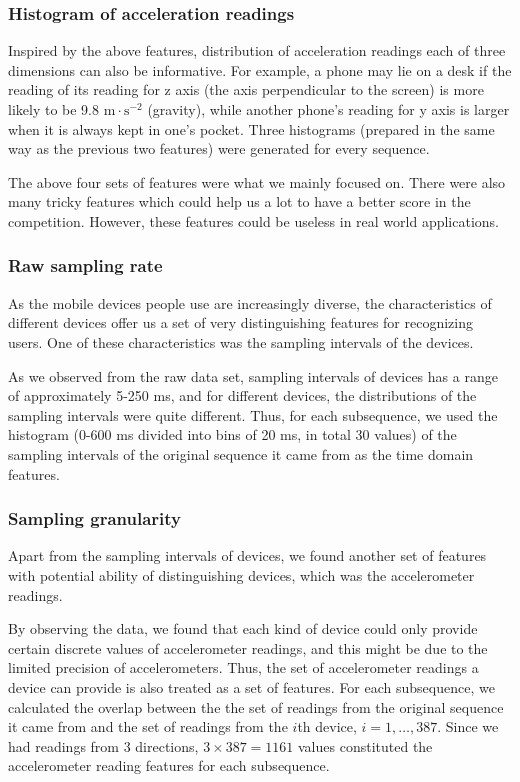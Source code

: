 \documentclass{article} %
\begin{document}
\subsubsection{Histogram of acceleration readings}
Inspired by the above features, distribution of acceleration readings each of three dimensions can also be informative. For example, a phone may lie on a desk if the reading of its reading for z axis (the axis perpendicular to the screen) is more likely to be 9.8 $\mathrm{m}\cdot \mathrm{s}^{-2}$ (gravity), while another phone's reading for y axis is larger when it is always kept in one's pocket. Three histograms (prepared in the same way as the previous two features) were generated for every sequence.

The above four sets of features were what we mainly focused on. There were also many tricky features which could help us a lot to have a better score in the competition. However, these features could be useless in real world applications. 

\subsubsection{Raw sampling rate}
As the mobile devices people use are increasingly diverse, the characteristics of different devices offer us a set of very distinguishing features for recognizing users. One of these characteristics was the sampling intervals of the devices.

As we observed from the raw data set, sampling intervals of devices has a range of approximately 5-250 ms, and for different devices, the distributions of the sampling intervals were quite different. Thus, for each subsequence, we used the histogram (0-600 ms divided into bins of 20 ms, in total 30 values) of the sampling intervals of the original sequence it came from as the time domain features. 

\subsubsection{Sampling granularity}
Apart from the sampling intervals of devices, we found another set of features with potential ability of distinguishing devices, which was the accelerometer readings.

By observing the data, we found that each kind of device could only provide certain discrete values of accelerometer readings, and this might be due to the limited precision of accelerometers. Thus, the set of accelerometer readings a device can provide is also treated as a set of features. For each subsequence, we calculated the overlap between the the set of readings from the original sequence it came from and the set of readings from the $i$th device, $i=1,\ldots,387$. Since we had readings from 3 directions, $3\times 387 = 1161$ values constituted the accelerometer reading features for each subsequence.
\end{document}
